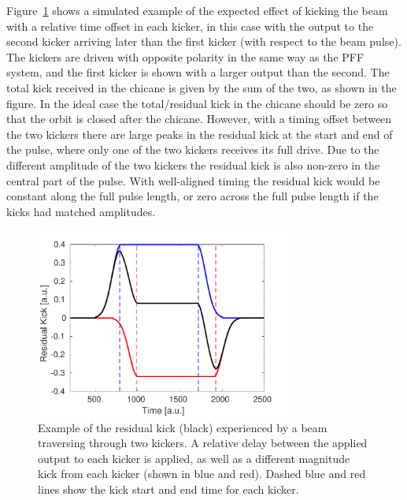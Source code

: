 Figure~\ref{f:relDelay_sim} shows a simulated example of the expected effect of kicking the beam with a relative time offset in each kicker, in this case with the output to the second kicker arriving later than the first kicker (with respect to the beam pulse). The kickers are driven with opposite polarity in the same way as the PFF system, and the first kicker is shown with a larger output than the second. The total kick received in the chicane is given by the sum of the two, as shown in the figure. In the ideal case the total/residual kick in the chicane should be zero so that the orbit is closed after the chicane. However, with a timing offset between the two kickers there are large peaks in the residual kick at the start and end of the pulse, where only one of the two kickers receives its full drive. Due to the different amplitude of the two kickers the residual kick is also non-zero in the central part of the pulse. With well-aligned timing the residual kick would be constant along the full pulse length, or zero across the full pulse length if the kicks had matched amplitudes.

\begin{figure}
  \centering
  \includegraphics[width=0.75\textwidth]{Figures/commissioning/relDelay_sim}
  \caption{Example of the residual kick (black) experienced by a beam traversing through two kickers. A relative delay between the applied output to each kicker is applied, as well as a different magnitude kick from each kicker (shown in blue and red). Dashed blue and red lines show the kick start and end time for each kicker.}
  \label{f:relDelay_sim}
\end{figure}

